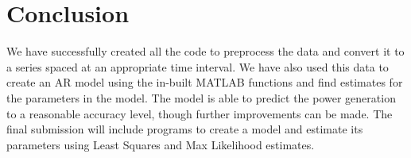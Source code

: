 \documentclass[journal]{IEEEtran}
\begin{document}




\section{Conclusion}
We have successfully created all the code to preprocess the data and convert it to a series spaced at an appropriate time interval. We have also used this data to create an AR model using the in-built MATLAB functions and find estimates for the parameters in the model. The model is able to predict the power generation to a reasonable accuracy level, though further improvements can be made. The final submission will include programs to create a model and estimate its parameters using Least Squares and Max Likelihood estimates.









\ifCLASSOPTIONcaptionsoff
  \newpage
\fi





%
%
%
\end{document}
